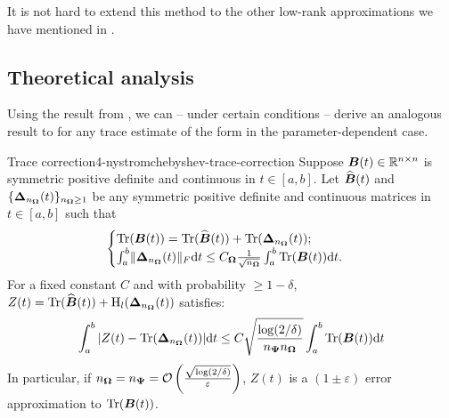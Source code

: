 It is not hard to extend this method to the other low-rank approximations
we have mentioned in .


\subsection{Theoretical analysis}
\label{subsec:4-nystromchebyshev-analysis}

Using the result from ,
we can -- under certain conditions -- derive an analogous result
to \cite{meyer2021hutch} for any trace estimate of the form
 in the parameter-dependent case.

\begin{theorem}{Trace correction}{4-nystromchebyshev-trace-correction}
    Suppose $\boldsymbol{B}(t) \in \mathbb{R}^{n \times n}$ is symmetric positive definite
    and continuous in $t \in [a, b]$. Let $\widehat{\boldsymbol{B}}(t)$ and
    $\{\boldsymbol{\Delta}_{n_{\boldsymbol{\Omega}}}(t)\}_{n_{\boldsymbol{\Omega}} \geq 1}$ be any
    symmetric positive definite and continuous matrices in $t \in [a, b]$ such that
    \begin{equation}
        \begin{cases}
            \operatorname{Tr}(\boldsymbol{B}(t)) = \operatorname{Tr}(\widehat{\boldsymbol{B}}(t)) + \operatorname{Tr}(\boldsymbol{\Delta}_{n_{\boldsymbol{\Omega}}}(t)); \\
            \int_{a}^{b} \lVert \boldsymbol{\Delta}_{n_{\boldsymbol{\Omega}}}(t) \rVert _F \mathrm{d}t \leq C_{\boldsymbol{\Omega}} \frac{1}{\sqrt{n_{\boldsymbol{\Omega}}}} \int_{a}^{b} \operatorname{Tr}(\boldsymbol{B}(t)) \mathrm{d}t.
        \end{cases}
    \end{equation}
    For a fixed constant $C$ and with probability $\geq 1 - \delta$, $Z(t) = \operatorname{Tr}(\widehat{\boldsymbol{B}}(t)) + \operatorname{H}_l(\boldsymbol{\Delta}_{n_{\boldsymbol{\Omega}}}(t))$ satisfies:
    \begin{equation}
        \int_{a}^{b} |Z(t) - \operatorname{Tr}(\boldsymbol{\Delta}_{n_{\boldsymbol{\Omega}}}(t))| \mathrm{d}t \leq C \sqrt{\frac{\log(2/\delta)}{n_{\boldsymbol{\Psi}} n_{\boldsymbol{\Omega}}}} \int_{a}^{b} \operatorname{Tr}(\boldsymbol{B}(t)) \mathrm{d}t
    \end{equation}
    In particular, if $n_{\boldsymbol{\Omega}}=n_{\boldsymbol{\Psi}}=\mathcal{O}\left( \frac{\sqrt{\log(2/\delta)}}{\varepsilon} \right)$, $Z(t)$ is a $(1 \pm \varepsilon)$ error approximation to $\operatorname{Tr}(\boldsymbol{B}(t))$.
\end{theorem}

